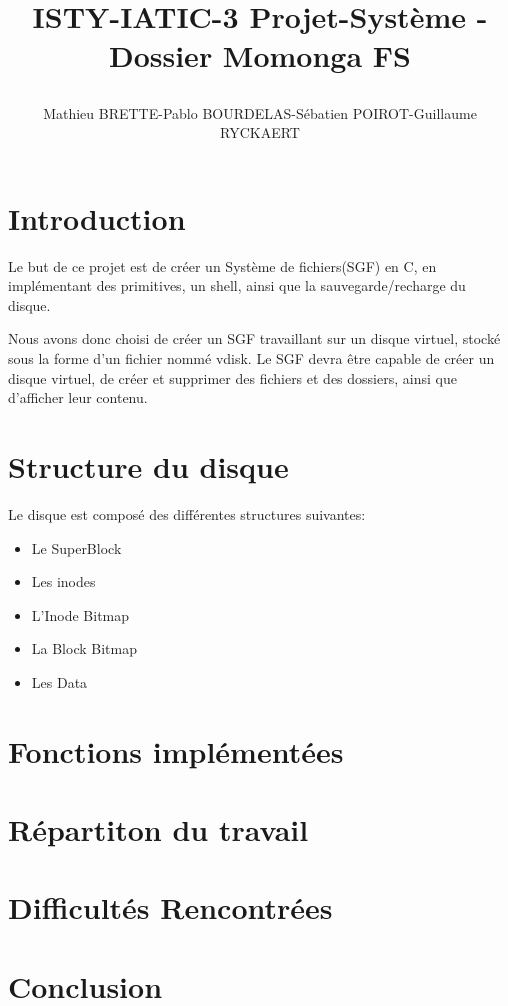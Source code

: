 \documentclass{report}
\begin{document}
\onehalfspacing
\title{%
    \begin{minipage}\linewidth
        \centering
        ISTY-IATIC-3
        \vskip 3pt
        \large Projet-Système - Dossier Momonga FS
    \author{Mathieu BRETTE-Pablo BOURDELAS-Sébatien POIROT-Guillaume RYCKAERT}
    \end{minipage}
 }
 \maketitle

 \section*{Introduction}

 Le but de ce projet est de créer un Système de fichiers(SGF) en C, en implémentant des primitives, un shell, ainsi que la sauvegarde/recharge du disque.

Nous avons donc choisi de créer un SGF travaillant sur un disque virtuel, stocké sous la forme d'un fichier nommé vdisk. Le SGF devra être capable de créer un disque virtuel, de créer et supprimer des fichiers et des dossiers, ainsi que d'afficher leur contenu.
\newpage

\section*{Structure du disque}
Le disque est composé des différentes structures suivantes:
\begin{itemize}
\item Le SuperBlock
\item Les inodes
\item L'Inode Bitmap
\item La Block Bitmap
\item Les Data
\end{itemize}

\newpage 





\section*{Fonctions implémentées}


\section*{Répartiton du travail}

\section*{Difficultés Rencontrées}



\section*{Conclusion}
\end{document}
